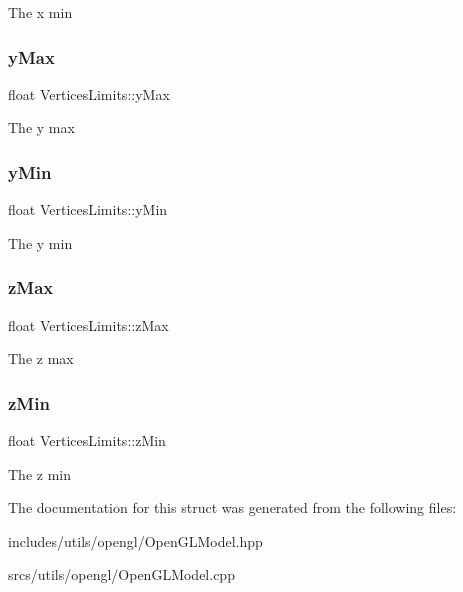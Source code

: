 The x min \mbox{\label{struct_vertices_limits_a7983184f6fce60048225d9efbc22d7ba}} 
\subsubsection{\texorpdfstring{y\+Max}{yMax}}
{\footnotesize\ttfamily float Vertices\+Limits\+::y\+Max}

The y max \mbox{\label{struct_vertices_limits_a5301a3b6bcbe63eeb66b1f12e6cd46d9}} 
\subsubsection{\texorpdfstring{y\+Min}{yMin}}
{\footnotesize\ttfamily float Vertices\+Limits\+::y\+Min}

The y min \mbox{\label{struct_vertices_limits_a73636d9187c41906a82004c66d9a6e3f}} 
\subsubsection{\texorpdfstring{z\+Max}{zMax}}
{\footnotesize\ttfamily float Vertices\+Limits\+::z\+Max}

The z max \mbox{\label{struct_vertices_limits_ad3367e8242446d5a7d1f9143ee82165b}} 
\subsubsection{\texorpdfstring{z\+Min}{zMin}}
{\footnotesize\ttfamily float Vertices\+Limits\+::z\+Min}

The z min 

The documentation for this struct was generated from the following files\+:\begin{DoxyCompactItemize}
\item 
includes/utils/opengl/Open\+G\+L\+Model.\+hpp\item 
srcs/utils/opengl/Open\+G\+L\+Model.\+cpp\end{DoxyCompactItemize}
